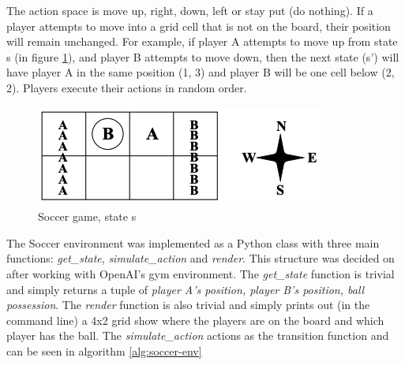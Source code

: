 \documentclass[conference]{IEEEtran}
\begin{document}
The action space is move up, right, down, left or stay put (do nothing). If a player attempts to move into a grid cell that is not on the board, their position will remain unchanged. For example, if player A attempts to move up from state s (in figure \ref{fig:game-board}), and player B attempts to move down, then the next state (s') will have player A in the same position (1, 3) and player B will be one cell below (2, 2). Players execute their actions in random order.

\begin{figure}[]
    \centering
    \includegraphics[scale=0.45]{figs/game-board}
    \caption{Soccer game, state s}
    \label{fig:game-board}
\end{figure}

The Soccer environment was implemented as a Python class with three main functions: \textit{get\_state}, \textit{simulate\_action} and \textit{render}. This structure was decided on after working with OpenAI's gym environment. The \textit{get\_state} function is trivial and simply returns a tuple of \textit{player A's position, player B's position, ball possession}. The \textit{render} function is also trivial and simply prints out (in the command line) a 4x2 grid show where the players are on the board and which player has the ball. The \textit{simulate\_action} actions as the transition function and can be seen in algorithm \ref{alg:soccer-env}
\end{document}
